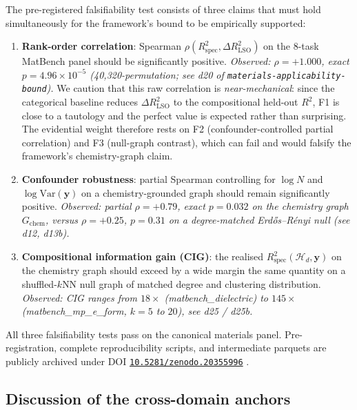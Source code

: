 \documentclass[11pt,a4paper]{article}
\theoremstyle{plain}
\theoremstyle{definition}
\theoremstyle{remark}
\newcommand{\by}{\mathbf{y}}
\newcommand{\Var}{\mathrm{Var}}
\newcommand{\Rspec}{R^2_{\mathrm{spec}}}
\newcommand{\Hcal}{\mathcal{H}}
\begin{document}
The pre-registered falsifiability test consists of three claims that
must hold simultaneously for the framework's bound to be empirically
supported:

\begin{enumerate}[label=(F\arabic*),leftmargin=*]
\item \textbf{Rank-order correlation}: Spearman $\rho(\Rspec, \Delta
    R^2_{\mathrm{LSO}})$ on the 8-task MatBench panel should be
    significantly positive.  \emph{Observed: $\rho = +1.000$, exact
    $p = 4.96 \times 10^{-5}$ (40,320-permutation; see d20
    of \texttt{materials-applicability-bound}).}  We caution that this
    raw correlation is \emph{near-mechanical}: since the categorical
    baseline reduces $\Delta R^2_{\mathrm{LSO}}$ to the compositional
    held-out $R^2$, F1 is close to a tautology and the perfect value is
    expected rather than surprising.  The evidential weight therefore
    rests on F2 (confounder-controlled partial correlation) and F3
    (null-graph contrast), which can fail and would falsify the
    framework's chemistry-graph claim.
\item \textbf{Confounder robustness}: partial Spearman controlling
    for $\log N$ and $\log \Var(\by)$ on a chemistry-grounded graph
    should remain significantly positive.  \emph{Observed: partial
    $\rho = +0.79$, exact $p = 0.032$ on the chemistry graph $G_{\mathrm{chem}}$,
    versus $\rho = +0.25$, $p = 0.31$ on a degree-matched Erd\H{o}s--R\'enyi
    null (see d12, d13b).}
\item \textbf{Compositional information gain (CIG)}: the realised
    $\Rspec(\Hcal_d, \by)$ on the chemistry graph should exceed by
    a wide margin the same quantity on a shuffled-$k$NN null graph
    of matched degree and clustering distribution.  \emph{Observed:
    CIG ranges from $18\times$ (matbench\_dielectric) to $145\times$
    (matbench\_mp\_e\_form, $k = 5$ to $20$), see d25 / d25b.}
\end{enumerate}

All three falsifiability tests pass on the canonical materials panel.
Pre-registration, complete reproducibility scripts, and intermediate
parquets are publicly archived under DOI
\href{https://doi.org/10.5281/zenodo.20355996}{\texttt{10.5281/zenodo.20355996}}
\citep{FossePallares2026applicabilityBound}.

\subsection{Discussion of the cross-domain anchors}
\label{subsec:emp-cross-domain}
\end{document}
